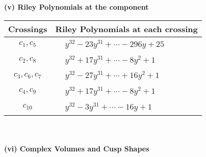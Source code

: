 \documentclass[1p]{elsarticle_modified}
\theoremstyle{definition}
\begin{document}
\newpage\renewcommand{\arraystretch}{1}
\flushleft \textbf{(v) Riley Polynomials at the component}\newline \\
\begin{tabular}{m{50pt}|m{274pt}}
Crossings & \hspace{64pt}Riley Polynomials at each crossing \\
\hline $$\begin{aligned}c_{1},c_{5}\end{aligned}$$&$\begin{aligned}
&y^{32}-23 y^{31}+\cdots-296 y+25
\end{aligned}$\\
\hline $$\begin{aligned}c_{2},c_{8}\end{aligned}$$&$\begin{aligned}
&y^{32}+17 y^{31}+\cdots-8 y^2+1
\end{aligned}$\\
\hline $$\begin{aligned}c_{3},c_{6},c_{7}\end{aligned}$$&$\begin{aligned}
&y^{32}-27 y^{31}+\cdots+16 y^2+1
\end{aligned}$\\
\hline $$\begin{aligned}c_{4},c_{9}\end{aligned}$$&$\begin{aligned}
&y^{32}+17 y^{31}+\cdots-8 y^2+1
\end{aligned}$\\
\hline $$\begin{aligned}c_{10}\end{aligned}$$&$\begin{aligned}
&y^{32}-3 y^{31}+\cdots-16 y+1
\end{aligned}$\\
\hline
\end{tabular}\\~\\
\newpage\flushleft \textbf{(vi) Complex Volumes and Cusp Shapes}
\end{document}
